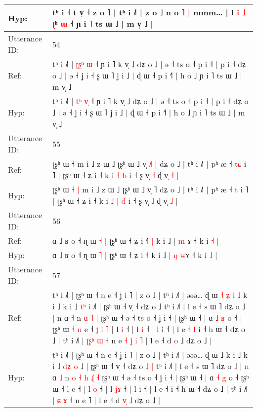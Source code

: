 \documentclass[10pt]{article}
\DeclareRobustCommand{\hl}[1]{{\textcolor{red}{#1}}}
\begin{document}
\begin{longtable}{ll}
 \\
Hyp: & tʰ i ˧ t v̩ ˧ z o ˥ | tʰ i ˩˥ | z o ˩ n o ˥\hl{ }\hl{|} mmm… | l \hl{i} \hl{˩} \hl{ʈ}ʰ \hl{ɯ} ˧ ɲ i ˥ ts ɯ ˩ | m v̩ ˩\hl{ }\hl{|}
 \\
\midrule
Utterance ID: & 54 \\
Ref: & tʰ i ˩˥ | \hl{ʈ}\hl{ʂ}ʰ \hl{}\hl{ɯ} ˧ ɲ i ˥ k v̩ ˩ dʑ o ˩ | ə ˧ ts o ˧ p i ˧ | p i ˧ dʑ o ˩ | ə ˧ ʝ i ˧ ʂ ɯ ˥ ʝ i ˩ | ɖ ɯ ˧ p i ˧˥ | h o ˩ ɲ i ˥ ts ɯ ˩ | m v̩ ˩
 \\
Hyp: & tʰ i ˩˥ | \hl{}\hl{t}ʰ \hl{v}\hl{̩} ˧ ɲ i ˥ k v̩ ˩ dʑ o ˩ | ə ˧ ts o ˧ p i ˧ | p i ˧ dʑ o ˩ | ə ˧ ʝ i ˧ ʂ ɯ ˥ ʝ i ˩ | ɖ ɯ ˧ p i ˧˥ | h o ˩ ɲ i ˥ ts ɯ ˩ | m v̩ ˩
 \\
\midrule
Utterance ID: & 55 \\
Ref: & ʈʂʰ ɯ ˧\hl{}\hl{} m i ˩ z ɯ ˩ ʈʂʰ ɯ ˩ v̩ \hl{˩}˥\hl{ }\hl{|} dʑ o ˩ | tʰ i ˩˥ | pʰ æ ˧ t\hl{ɕ} i ˥ | ʈʂʰ ɯ ˧ ʑ i ˧ k i\hl{}\hl{} \hl{˧} \hl{b} i ˧ ʂ v̩ \hl{˧} ɖ v̩ \hl{˧} |
 \\
Hyp: & ʈʂʰ ɯ ˧\hl{ }\hl{|} m i ˩ z ɯ ˩ ʈʂʰ ɯ ˩ v̩ \hl{}˥\hl{}\hl{} dʑ o ˩ | tʰ i ˩˥ | pʰ æ ˧ t\hl{} i ˥ | ʈʂʰ ɯ ˧ ʑ i ˧ k i\hl{ }\hl{˩} \hl{|} \hl{d} i ˧ ʂ v̩ \hl{˩} ɖ v̩ \hl{˩} |
 \\
\midrule
Utterance ID: & 56 \\
Ref: & ɑ ˩ ʁ o ˧ ɳ ɯ \hl{˧} | ʈʂʰ ɯ ˧ ʑ i ˧\hl{˥}\hl{ }\hl{|} k i ˩ | \hl{m} \hl{}ɤ ˧ k i \hl{˧} |
 \\
Hyp: & ɑ ˩ ʁ o ˧ ɳ ɯ \hl{˥} | ʈʂʰ ɯ ˧ ʑ i ˧\hl{}\hl{}\hl{} k i ˩ | \hl{ŋ} \hl{w}ɤ ˧ k i \hl{˩} |
 \\
\midrule
Utterance ID: & 57 \\
Ref: & tʰ i ˩˥ | ʈʂʰ ɯ ˧ n e ˧ ʝ i ˥ | z o ˩ | tʰ i ˩˥ | əəə… ɖ ɯ\hl{ }\hl{˧}\hl{ }\hl{ʑ}\hl{ }\hl{i} ˩ k i ˩ k i ˩ \hl{t}\hl{ʰ} \hl{i} ˩\hl{˥} | ʈʂʰ ɯ ˧ v̩ ˧ dʑ o ˩\hl{}\hl{} tʰ i ˩˥ | l e ˧ s ɯ ˥ dʑ o ˩ | n ɑ \hl{˧} n\hl{}\hl{}\hl{}\hl{} \hl{ɑ} \hl{}\hl{˥} \hl{|} ʈʂʰ ɯ ˧ ə ˧ ts o ˧ ʝ i ˧ | ʈʂʰ ɯ ˧ | ɑ \hl{˩} \hl{ʁ} o ˧\hl{ }\hl{|} ʈʂʰ ɯ ˧ \hl{n} e ˧\hl{ }\hl{ʝ}\hl{ }\hl{i}\hl{ }\hl{˥} | l \hl{i} ˧ | l \hl{}\hl{i} ˧ | l i ˧ | l e ˧\hl{ }\hl{l} i ˧ h ɯ ˧ dʑ o ˩ | tʰ i ˩˥ | \hl{ʈ}\hl{ʂ}\hl{ʰ} \hl{ɯ} ˧ n e\hl{ }\hl{˧}\hl{ }\hl{ʝ}\hl{ }\hl{i} ˥ | l e ˧ d \hl{}\hl{o} ˩ dʑ o ˩ |
 \\
Hyp: & tʰ i ˩˥ | ʈʂʰ ɯ ˧ n e ˧ ʝ i ˥ | z o ˩ | tʰ i ˩˥ | əəə… ɖ ɯ\hl{}\hl{}\hl{}\hl{}\hl{}\hl{} ˩ k i ˩ k i ˩ \hl{d}\hl{ʑ} \hl{o} ˩\hl{} | ʈʂʰ ɯ ˧ v̩ ˧ dʑ o ˩\hl{ }\hl{|} tʰ i ˩˥ | l e ˧ s ɯ ˥ dʑ o ˩ | n ɑ \hl{˩} n\hl{ }\hl{o}\hl{ }\hl{˧} \hl{h} \hl{ɻ}\hl{̍} \hl{˧} ʈʂʰ ɯ ˧ ə ˧ ts o ˧ ʝ i ˧ | ʈʂʰ ɯ ˧ | ɑ \hl{˧} \hl{g} o ˧\hl{}\hl{} ʈʂʰ ɯ ˧ \hl{l} e ˧\hl{}\hl{}\hl{}\hl{}\hl{}\hl{} | l \hl{o} ˧ | l \hl{j}\hl{ɤ} ˧ | l i ˧ | l e ˧\hl{}\hl{} i ˧ h ɯ ˧ dʑ o ˩ | tʰ i ˩˥ | \hl{}\hl{}\hl{ɕ} \hl{ɤ} ˧ n e\hl{}\hl{}\hl{}\hl{}\hl{}\hl{} ˥ | l e ˧ d \hl{v}\hl{̩} ˩ dʑ o ˩ |

\end{longtable}
\end{document}
